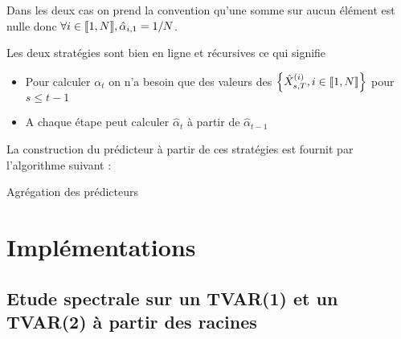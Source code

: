 \documentclass{report}
\begin{document}
Dans les deux cas on prend la convention qu'une somme sur aucun élément est nulle donc $\forall i \in { \left\llbracket 1,N \right\rrbracket}, \hat{\alpha}_{i,1} = 1/N$. 
\begin{Rque}
Les deux stratégies sont bien en ligne et récursives ce qui signifie 
\begin{itemize}
\item Pour calculer $\alpha_t$ on n'a besoin que des valeurs des ${ \left\lbrace  \hat{X}_{s,T}^{(i)}, i\in { \left\llbracket 1,N \right\rrbracket} \right\rbrace }$ pour $s\leq t-1$
\item A chaque étape peut calculer $\hat{\alpha}_t$ à partir de $\hat{\alpha}_{t-1}$
\end{itemize}
\end{Rque}
La construction du prédicteur à partir de ces stratégies est fournit par l'algorithme suivant : \\
\begin{algorithm}[H]
 \caption{Agrégation des prédicteurs}
 \label{algo:agregation}
\end{algorithm}
\chapter{Implémentations}
\section{Etude spectrale sur un TVAR(1) et un TVAR(2) à partir des racines}
\end{document}
